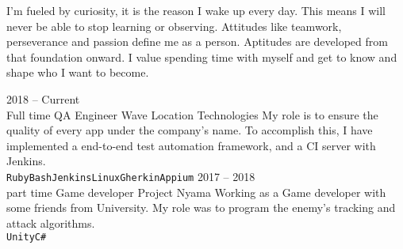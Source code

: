 \documentclass[9pt]{developercv} %
\begin{document}
\vspace{0.5cm}



\begin{minipage}[t]{0.4\textwidth} %
	\vspace{-\baselineskip} %
	I'm fueled by curiosity, it is the reason I wake up every day.
	This means I will never be able to stop learning or observing.
	Attitudes like teamwork, perseverance and passion define me as a person.
	Aptitudes are developed from that foundation onward.
	I value spending time with myself and get to know and shape who I want to become.\\
\end{minipage}
\hfill %
\begin{minipage}[t]{0.5\textwidth} %
	\vspace{-\baselineskip} %
	\begin{barchart}{5.5}
	\end{barchart}
\end{minipage}



\begin{entrylist}
	\entry
		{2018 -- Current\\\footnotesize{Full time}}
		{QA Engineer}
		{Wave Location Technologies}
		{My role is to ensure the quality of every app under the company's name.
		To accomplish this, I have implemented a end-to-end test automation framework, and a CI server with Jenkins.\\ \texttt{Ruby}\slashsep\texttt{Bash}\slashsep\texttt{Jenkins}\slashsep\texttt{Linux}\slashsep\texttt{Gherkin}\slashsep\texttt{Appium}}
	\entry
		{2017 -- 2018\\\footnotesize{part time}}
		{Game developer}
		{Project Nyama}
		{Working as a Game developer with some friends from University.
		My role was to program the enemy's tracking and attack algorithms.\\ \texttt{Unity}\slashsep\texttt{C\#}}
\end{entrylist}
\end{document}

